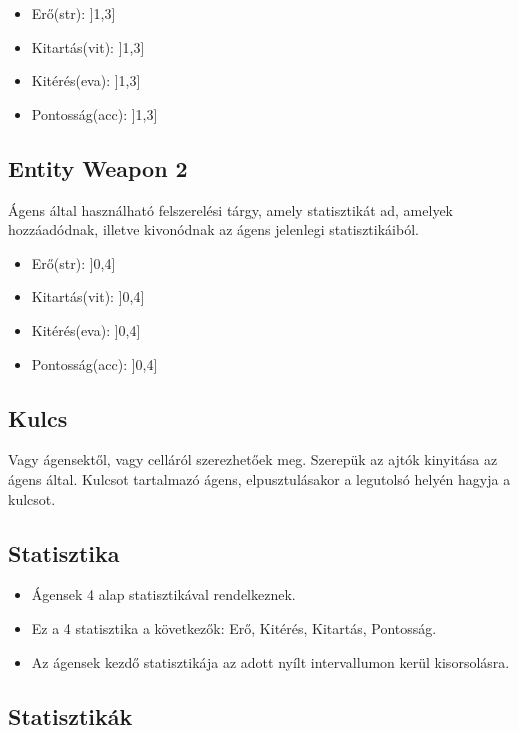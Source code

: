 \begin{itemize}
    \item Erő(str): ]1,3]
    \item Kitartás(vit): ]1,3]
    \item Kitérés(eva): ]1,3]
    \item Pontosság(acc): ]1,3]
\end{itemize}

\subsection{Entity Weapon 2}

Ágens által használható felszerelési tárgy, amely statisztikát ad, amelyek hozzáadódnak, illetve kivonódnak az ágens jelenlegi statisztikáiból.

\begin{itemize}
    \item Erő(str): ]0,4]
    \item Kitartás(vit): ]0,4]
    \item Kitérés(eva): ]0,4]
    \item Pontosság(acc): ]0,4]
\end{itemize}

\subsection{Kulcs}

Vagy ágensektől, vagy celláról szerezhetőek meg.
Szerepük az ajtók kinyitása az ágens által.
Kulcsot tartalmazó ágens, elpusztulásakor a legutolsó helyén hagyja a kulcsot.


\subsection{Statisztika}
\label{statisztika}
\begin{itemize}
    \item Ágensek 4 alap statisztikával rendelkeznek.
    \item Ez a 4 statisztika a következők: Erő, Kitérés, Kitartás, Pontosság.
    \item Az ágensek kezdő statisztikája az adott nyílt intervallumon kerül kisorsolásra.
\end{itemize}

\subsection{Statisztikák}

